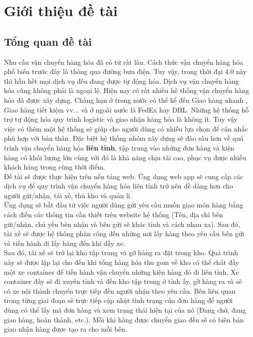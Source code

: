  \chapter{Giới thiệu đề tài}\label{chap:introduction}
	
	\section{Tổng quan đề tài}
	Nhu cầu vận chuyển hàng hóa đã có từ rất lâu. Cách thức vận chuyển hàng hóa phổ biến trước đây là thông qua đường bưu điện. Tuy vậy, trong thời đại 4.0 này thì hầu hết mọi dịch vụ đều đang được tự động hóa. Dịch vụ vận chuyển hàng hóa cũng không phải là ngoại lệ. Hiện nay có rất nhiều hệ thống vận chuyển hàng hóa đã được xây dựng. Chẳng hạn ở trong nước có thể kể đến Giao hàng nhanh \cite{ghn}, Giao hàng tiết kiệm \cite{ghtk} vv... và ở ngoài nước là FedEx hay DHL. Những hệ thống hỗ trợ tự động hóa quy trình logistic và giao nhận hàng hóa là không ít. Tuy vậy việc có thêm một hệ thống sẽ giúp cho người dùng có nhiều lựa chọn để cân nhắc phù hợp với bản thân. Đặc biệt hệ thống nhóm xây dựng sẽ đào sâu hơn về quá trình vận chuyển hàng hóa
	\textbf{liên tỉnh}, tập trung vào những đơn hàng và kiện hàng có khối lượng lớn cùng với đó là khả năng chịu tải cao, phục vụ được nhiều khách hàng trong cùng thời điểm.\\
	
	Đề tài sẽ được thực hiện trên nền tảng web. Ứng dụng web app sẽ cung cấp các dịch vụ để quy trình vận chuyển hàng hóa liên tỉnh trở nên dễ dàng hơn cho người gửi/nhận, tài xế, thủ kho và quản lí.\\
	
	Ứng dụng sẽ bắt đầu từ việc người dùng gửi yêu cầu muốn giao món hàng bằng cách điền các thông tin cần thiết trên website hệ thống (Tên, địa chỉ bên gửi/nhận, chủ yếu bên nhận và bên gửi sẽ khác tỉnh và cách nhau xa). Sau đó, tài xế sẽ được hệ thống phân công đến những nơi lấy hàng theo yêu cầu bên gửi và tiến hành đi lấy hàng đến khi đầy xe.\\
	
	Sau đó, tài xế sẽ trở lại kho tập trung và gỡ hàng ra đặt trong kho. Quá trình này sẽ được lặp lại cho đến khi tổng hàng hóa thu gom về kho có thể chất đầy một xe container để tiến hành vận chuyển những kiện hàng đó đi liên tỉnh. Xe container đấy sẽ đi xuyên tỉnh và đến kho tập trung ở tỉnh ấy, gỡ hàng ra và sẽ có xe nội thành chuyển trực tiếp đến người nhận theo yêu cầu. Bên liên quan trong từng giai đoạn sẽ trực tiếp cập nhật tình trạng của đơn hàng để người dùng có thể lấy mã đơn hàng và xem trạng thái hiện tại của nó (Đang chờ, đang giao hàng, hoàn thành, etc.). Mỗi khi hàng được chuyển giao đều sẽ có biên bản giao nhận hàng được tạo ra cho mỗi bên.
	
